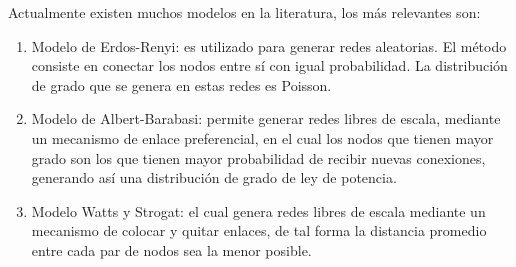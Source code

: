 Actualmente existen muchos modelos en la literatura, los más relevantes son:

\begin{enumerate}
    \item Modelo de Erdos-Renyi\cite{Erdos1959}: es utilizado para generar redes aleatorias. El método consiste en conectar los nodos entre sí con igual probabilidad. La distribución de grado que se genera en estas redes es Poisson.
    \item Modelo de Albert-Barabasi\cite{Barabaacutesi1999}: permite generar redes libres de escala, mediante un mecanismo de enlace preferencial, en el cual los nodos que tienen mayor grado son los que tienen mayor probabilidad de recibir nuevas conexiones, generando así una distribución de grado de ley de potencia.
    \item Modelo Watts y Strogat\cite{Watts1998}: el cual genera redes libres de escala mediante un mecanismo de colocar y quitar enlaces, de tal forma la distancia promedio entre cada par de nodos sea la menor posible.
\end{enumerate}

\newpage
